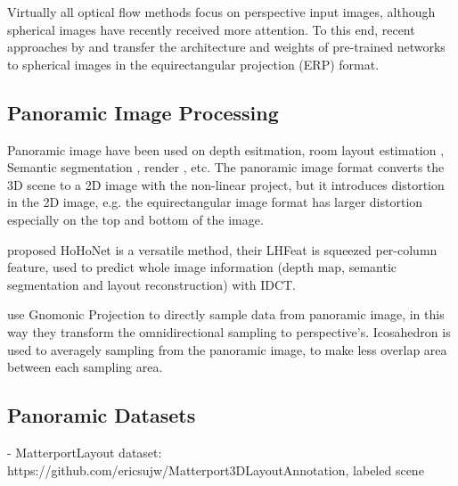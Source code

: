 Virtually all optical flow methods focus on perspective input images, although spherical images have recently received more attention.
%
To this end, recent approaches by \citet{ArtizZAD2021} and \citet{BhandZY2021}
transfer the architecture and weights of pre-trained networks \cite{DosovFIHHGSCB2015,HuiTC2018} to spherical images in the equirectangular projection (ERP) format.


\subsection{Panoramic Image Processing}

Panoramic image have been used on 
depth esitmation\cite{WangSTCS2020}, room layout estimation \cite{WangYSCT2021, Tran2021}, Semantic segmentation \cite{YangZRHS2021}, render \cite{XuZXTG2021}, etc.
The panoramic image format converts the 3D scene to a 2D image with the non-linear project, but it introduces distortion in the 2D image, e.g. the equirectangular image format has larger distortion especially on the top and bottom of the image.

\citet{SunSC2021} proposed HoHoNet is a versatile method, their LHFeat is squeezed per-column feature, used to predict whole image information (depth map, semantic segmentation and layout reconstruction) with IDCT. 
\cite{WangYSCT2020}

\cite{CoorsCG2018} use Gnomonic Projection to directly sample data from panoramic image, in this way they transform the omnidirectional sampling to perspective's.
\cite{EderPVBF2019}\citet{EderSLF2020} Icosahedron is used to averagely sampling from the panoramic image, to make less overlap area between each sampling area.
\citet{LuoZSX2019}
\citet{ZhangLSC2019}
\citet{LeeJYJY2019}

\citet{GkitsZAZD2020}
\citet{SuG2019}
\citet{CohenGKW2018}
\citet{JiangHKPMN2019}

\subsection{Panoramic Datasets}

- MatterportLayout dataset: https://github.com/ericsujw/Matterport3DLayoutAnnotation, labeled scene

